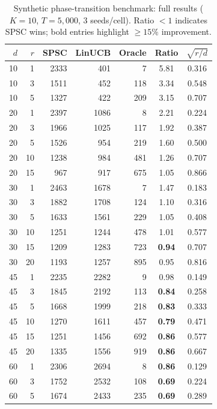 \documentclass{article}
\begin{document}
{\begin{table}[!htpb]
\centering
\caption{Synthetic phase-transition benchmark: full results
($K{=}10$, $T{=}5{,}000$, $3$ seeds/cell).
Ratio $< 1$ indicates SPSC wins; bold entries highlight
$\ge 15\%$ improvement.}
\label{tab:synthetic-phase}
\small
\setlength{\tabcolsep}{4pt}
\begin{tabular}{rr|rrr|cc}
\toprule
$d$ & $r$ & SPSC & LinUCB & Oracle & Ratio & $\sqrt{r/d}$ \\
\midrule
10 &  1 & 2333 &  401 &    7 & 5.81 & 0.316 \\
10 &  3 & 1511 &  452 &  118 & 3.34 & 0.548 \\
10 &  5 & 1327 &  422 &  209 & 3.15 & 0.707 \\
\midrule
20 &  1 & 2397 & 1086 &    8 & 2.21 & 0.224 \\
20 &  3 & 1966 & 1025 &  117 & 1.92 & 0.387 \\
20 &  5 & 1526 &  954 &  219 & 1.60 & 0.500 \\
20 & 10 & 1238 &  984 &  481 & 1.26 & 0.707 \\
20 & 15 &  967 &  917 &  675 & 1.05 & 0.866 \\
\midrule
30 &  1 & 2463 & 1678 &    7 & 1.47 & 0.183 \\
30 &  3 & 1882 & 1708 &  124 & 1.10 & 0.316 \\
30 &  5 & 1633 & 1561 &  229 & 1.05 & 0.408 \\
30 & 10 & 1251 & 1244 &  478 & 1.01 & 0.577 \\
30 & 15 & 1209 & 1283 &  723 & \textbf{0.94} & 0.707 \\
30 & 20 & 1193 & 1257 &  895 & 0.95 & 0.816 \\
\midrule
45 &  1 & 2235 & 2282 &    9 & 0.98 & 0.149 \\
45 &  3 & 1845 & 2192 &  113 & \textbf{0.84} & 0.258 \\
45 &  5 & 1668 & 1999 &  218 & \textbf{0.83} & 0.333 \\
45 & 10 & 1270 & 1611 &  457 & \textbf{0.79} & 0.471 \\
45 & 15 & 1251 & 1456 &  692 & \textbf{0.86} & 0.577 \\
45 & 20 & 1335 & 1556 &  919 & \textbf{0.86} & 0.667 \\
\midrule
60 &  1 & 2306 & 2694 &    8 & \textbf{0.86} & 0.129 \\
60 &  3 & 1752 & 2532 &  108 & \textbf{0.69} & 0.224 \\
60 &  5 & 1674 & 2433 &  235 & \textbf{0.69} & 0.289 \\

\end{tabular}
\end{table}}
\end{document}
